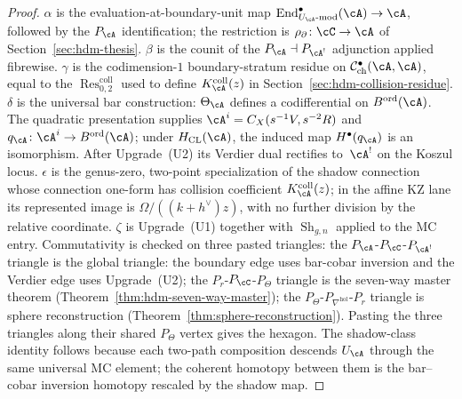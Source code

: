 \begin{proof}
$\alpha$ is the evaluation-at-boundary-unit map
$\mathrm{End}^{\bullet}_{U_\cA\text{-}\mathrm{mod}}(\cA)\to \cA$,
followed by the $P_\cA$ identification; the restriction is
$\rho_\partial\colon \cC\to\cA$ of
Section~\ref{sec:hdm-thesis}. $\beta$ is the counit of the
$P_\cA\dashv P_{\cA^!}$ adjunction applied fibrewise. $\gamma$ is the
codimension-$1$ boundary-stratum residue on
$\mathcal C^\bullet_{\mathrm{ch}}(\cA,\cA)$, equal to the
$\operatorname{Res}^{\mathrm{coll}}_{0,2}$ used to define
$K_\cA^{\mathrm{coll}}(z)$
in Section~\ref{sec:hdm-collision-residue}. $\delta$ is the universal
bar construction: $\Theta_\cA$ defines a codifferential on
$B^{\mathrm{ord}}(\cA)$.  The quadratic presentation supplies
$\cA^i=C_X(s^{-1}V,s^{-2}R)$ and
$q_\cA\colon\cA^i\to B^{\mathrm{ord}}(\cA)$; under
$H_{\mathrm{CL}}(\cA)$, the induced map $H^\bullet(q_\cA)$ is an
isomorphism.  After
Upgrade~\textup{(U2)} its Verdier dual rectifies to~$\cA^!$ on the
Koszul locus. $\epsilon$ is the genus-zero, two-point specialization
of the shadow connection whose connection one-form has collision
coefficient $K_\cA^{\mathrm{coll}}(z)$; in the affine KZ lane its
represented image is
$\Omega/((k+h^\vee)z)$, with no further division by the relative
coordinate. $\zeta$ is Upgrade~(U1) together
with $\operatorname{Sh}_{g,n}$ applied to the MC entry. Commutativity is checked
on three pasted triangles: the $P_\cA$-$P_\cC$-$P_{\cA^!}$ triangle
is the global triangle: the boundary edge uses bar-cobar inversion
and the Verdier edge uses Upgrade~\textup{(U2)}; the
$P_r$-$P_\cC$-$P_\Theta$ triangle is the seven-way master theorem
(Theorem~\ref{thm:hdm-seven-way-master}); the
$P_\Theta$-$P_{\nabla^{\mathrm{hol}}}$-$P_r$ triangle is sphere
reconstruction
(Theorem~\ref{thm:sphere-reconstruction}). Pasting the three
triangles along their shared $P_\Theta$ vertex gives the hexagon. The
shadow-class identity follows because each two-path composition
descends $U_\cA$ through the same universal MC element; the coherent
homotopy between them is the bar--cobar inversion homotopy rescaled
by the shadow map.
\end{proof}

